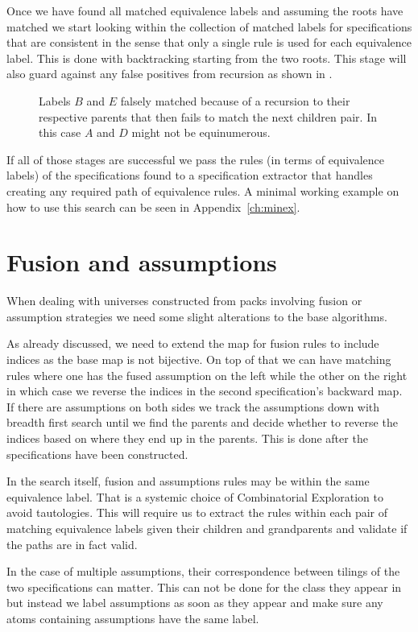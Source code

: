 Once we have found all matched equivalence labels and assuming the roots have matched we start looking within the collection of matched labels for specifications that are consistent in the sense that only a single rule is used for each equivalence label. This is done with backtracking starting from the two roots. This stage will also guard against any false positives from recursion as shown in .

\begin{figure}[ht!]
    \centering
    
    \caption{Labels $B$ and $E$ falsely matched because of a recursion to their respective parents that then fails to match the next children pair. In this case $A$ and $D$ might not be equinumerous.}
    \label{fig:recfalsepos}
\end{figure}

If all of those stages are successful we pass the rules (in terms of equivalence labels) of the specifications found to a specification extractor that handles creating any required path of equivalence rules. A minimal working example on how to use this search can be seen in Appendix~\ref{ch:minex}.


\section{Fusion and assumptions}
When dealing with universes constructed from packs involving fusion or assumption strategies we need some slight alterations to the base algorithms. 

As already discussed, we need to extend the map for fusion rules to include indices as the base map is not bijective. On top of that we can have matching rules where one has the fused assumption on the left while the other on the right in which case we reverse the indices in the second specification's backward map. If there are assumptions on both sides we track the assumptions down with breadth first search until we find the parents and decide whether to reverse the indices based on where they end up in the parents. This is done after the specifications have been constructed.

In the search itself, fusion and assumptions rules may be within the same equivalence label. That is a systemic choice of Combinatorial Exploration to avoid tautologies. This will require us to extract the rules within each pair of matching equivalence labels given their children and grandparents and validate if the paths are in fact valid.

In the case of multiple assumptions, their correspondence between tilings of the two specifications can matter. This can not be done for the class they appear in but instead we label assumptions as soon as they appear and make sure any atoms containing assumptions have the same label.